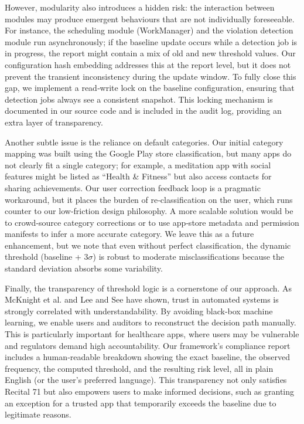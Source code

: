 However, modularity also introduces a hidden risk: the interaction between modules may produce emergent behaviours that are not individually foreseeable. For instance, the scheduling module (WorkManager) and the violation detection module run asynchronously; if the baseline update occurs while a detection job is in progress, the report might contain a mix of old and new threshold values. Our configuration hash embedding addresses this at the report level, but it does not prevent the transient inconsistency during the update window. To fully close this gap, we implement a read‑write lock on the baseline configuration, ensuring that detection jobs always see a consistent snapshot. This locking mechanism is documented in our source code and is included in the audit log, providing an extra layer of transparency.

Another subtle issue is the reliance on default categories. Our initial category mapping was built using the Google Play store classification, but many apps do not clearly fit a single category; for example, a meditation app with social features might be listed as ``Health \& Fitness'' but also access contacts for sharing achievements. Our user correction feedback loop is a pragmatic workaround, but it places the burden of re‑classification on the user, which runs counter to our low‑friction design philosophy. A more scalable solution would be to crowd‑source category corrections or to use app‑store metadata and permission manifests to infer a more accurate category. We leave this as a future enhancement, but we note that even without perfect classification, the dynamic threshold (baseline + $3\sigma$) is robust to moderate misclassifications because the standard deviation absorbs some variability.

Finally, the transparency of threshold logic is a cornerstone of our approach. As McKnight et al. \cite{33} and Lee and See \cite{34} have shown, trust in automated systems is strongly correlated with understandability. By avoiding black‑box machine learning, we enable users and auditors to reconstruct the decision path manually. This is particularly important for healthcare apps, where users may be vulnerable and regulators demand high accountability. Our framework's compliance report includes a human‑readable breakdown showing the exact baseline, the observed frequency, the computed threshold, and the resulting risk level, all in plain English (or the user's preferred language). This transparency not only satisfies Recital 71 but also empowers users to make informed decisions, such as granting an exception for a trusted app that temporarily exceeds the baseline due to legitimate reasons.

